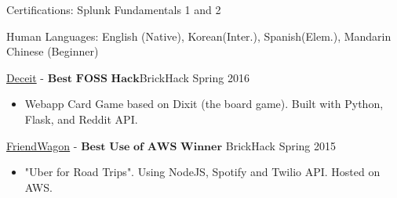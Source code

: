 \documentclass[11pt]{article}
\begin{document}
\inlineskillsection
{Certifications:}
{Splunk Fundamentals 1 and 2}

\inlineskillsection
{Human Languages:}
{English (Native), Korean(Inter.), Spanish(Elem.), Mandarin Chinese (Beginner)}




\spacedhrule{0.2em}{0.2em}  %

\projects
{{\href{https://github.com/gabeochoa/sokim}{Deceit}} - $\textbf{Best FOSS Hack}$}{BrickHack Spring 2016}
{
    \begin{itemize}[label={}]
        \setlength\itemsep{.005ex}
        \item{Webapp Card Game based on Dixit (the board game). Built with Python, Flask, and Reddit API.}
    \end{itemize}
}

\headedsubsection
{{\href{https://github.com/alanplotko/RoadTrip}{FriendWagon}} - $\textbf{Best Use of AWS Winner}$ }
{BrickHack Spring 2015}
{
    \begin{itemize}[label={}]
    	\setlength\itemsep{.005ex}
        \item{"Uber for Road Trips". Using NodeJS, Spotify and Twilio API. Hosted on AWS.}
    \end{itemize}
}
\end{document}
